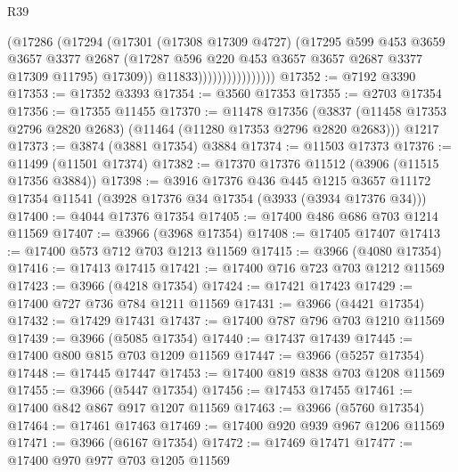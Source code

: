 \begin{lexlean}{R39}
\begin{coremodule}
                                (@17286
                                  (@17294
                                    (@17301
                                      (@17308 @17309 @4727)
                                      (@17295
                                        @599
                                        @453
                                        @3659
                                        @3657
                                        @3377
                                        @2687
                                        (@17287
                                          @596
                                          @220
                                          @453
                                          @3657
                                          @3657
                                          @2687
                                          @3377
                                          @17309
                                          @11795)
                                        @17309))
                                    @11833))))))))))))))))
@17352 := @7192 @3390
@17353 := @17352 @3393
@17354 := @3560 @17353
@17355 := @2703 @17354
@17356 := @17355 @11455
@17370 := @11478
    @17356
    (@3837 (@11458 @17353 @2796 @2820 @2683) (@11464 (@11280 @17353 @2796 @2820 @2683)))
    @1217
@17373 := @3874 (@3881 @17354) @3884
@17374 := @11503 @17373
@17376 := @11499 (@11501 @17374)
@17382 := @17370 @17376 @11512 (@3906 (@11515 @17356 @3884))
@17398 := @3916
    @17376
    @436
    @445
    @1215
    @3657
    @11172
    @17354
    @11541
    (@3928 @17376 @34 @17354 (@3933 (@3934 @17376 @34)))
@17400 := @4044 @17376 @17354
@17405 := @17400 @486 @686 @703 @1214 @11569
@17407 := @3966 (@3968 @17354)
@17408 := @17405 @17407
@17413 := @17400 @573 @712 @703 @1213 @11569
@17415 := @3966 (@4080 @17354)
@17416 := @17413 @17415
@17421 := @17400 @716 @723 @703 @1212 @11569
@17423 := @3966 (@4218 @17354)
@17424 := @17421 @17423
@17429 := @17400 @727 @736 @784 @1211 @11569
@17431 := @3966 (@4421 @17354)
@17432 := @17429 @17431
@17437 := @17400 @787 @796 @703 @1210 @11569
@17439 := @3966 (@5085 @17354)
@17440 := @17437 @17439
@17445 := @17400 @800 @815 @703 @1209 @11569
@17447 := @3966 (@5257 @17354)
@17448 := @17445 @17447
@17453 := @17400 @819 @838 @703 @1208 @11569
@17455 := @3966 (@5447 @17354)
@17456 := @17453 @17455
@17461 := @17400 @842 @867 @917 @1207 @11569
@17463 := @3966 (@5760 @17354)
@17464 := @17461 @17463
@17469 := @17400 @920 @939 @967 @1206 @11569
@17471 := @3966 (@6167 @17354)
@17472 := @17469 @17471
@17477 := @17400 @970 @977 @703 @1205 @11569

\end{coremodule}
\end{lexlean}
